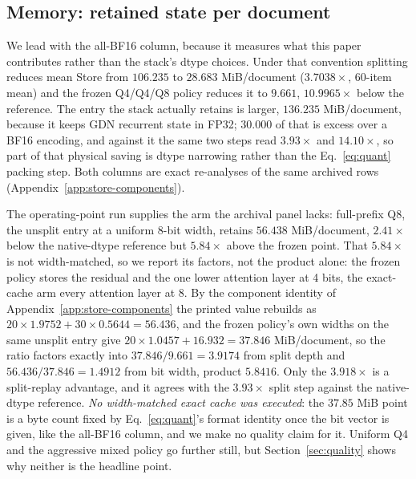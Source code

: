 \documentclass{article}
\begin{document}
\subsection{Memory: retained state per document}
\label{sec:memory}

We lead with the all-BF16 column, because it measures what this paper
contributes rather than the stack's dtype choices.  Under that convention
splitting reduces mean Store from $106.235$ to $28.683$ MiB/document
($3.7038\times$, 60-item mean) and the frozen Q4/Q4/Q8 policy reduces it to
$9.661$, $10.9965\times$ below the reference.  The entry the stack actually
retains is larger, $136.235$ MiB/document, because it keeps GDN recurrent state
in FP32; $30.000$ of that is excess over a BF16 encoding, and against it the
same two steps read $3.93\times$ and $14.10\times$, so part of that physical
saving is dtype narrowing rather than the Eq.~\ref{eq:quant} packing step.  Both
columns are exact re-analyses of the same archived rows
(Appendix~\ref{app:store-components}).

The operating-point run supplies the arm the archival panel lacks: full-prefix
Q8, the unsplit entry at a uniform 8-bit width, retains $56.438$ MiB/document,
$2.41\times$ below the native-dtype reference but $5.84\times$ above the frozen
point.  That $5.84\times$ is not width-matched, so
we report its factors, not the product alone: the frozen policy stores the
residual and the one lower attention layer at 4 bits, the exact-cache arm every
attention layer at 8.  By the component identity of
Appendix~\ref{app:store-components} the printed value rebuilds as
$20\times1.9752+30\times0.5644=56.436$, and the frozen policy's own widths on
the same unsplit entry give $20\times1.0457+16.932=37.846$ MiB/document, so the
ratio factors exactly into $37.846/9.661=3.9174$ from split depth and
$56.436/37.846=1.4912$ from bit width, product $5.8416$.  Only the $3.918\times$
is a split-replay advantage, and it agrees with the $3.93\times$ split step
against the native-dtype reference.  \emph{No width-matched exact cache was
executed}: the $37.85$ MiB point is a byte count fixed by Eq.~\ref{eq:quant}'s
format identity once the bit vector is given, like the all-BF16 column, and we
make no quality claim for it.  Uniform Q4 and the aggressive mixed policy go
further still, but Section~\ref{sec:quality} shows why neither is the headline
point.
\end{document}
